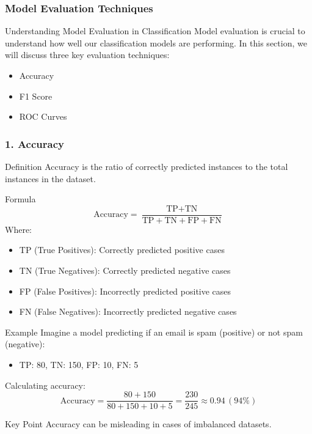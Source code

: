 \documentclass[aspectratio=169]{beamer}
\begin{document}
\begin{frame}[fragile]
    \frametitle{Model Evaluation Techniques}
    \begin{block}{Understanding Model Evaluation in Classification}
        Model evaluation is crucial to understand how well our classification models are performing. In this section, we will discuss three key evaluation techniques:
        \begin{itemize}
            \item Accuracy
            \item F1 Score
            \item ROC Curves
        \end{itemize}
    \end{block}
\end{frame}

\begin{frame}[fragile]
    \frametitle{1. Accuracy}
    \begin{block}{Definition}
        Accuracy is the ratio of correctly predicted instances to the total instances in the dataset.
    \end{block}
    
    \begin{block}{Formula}
        \begin{equation}
            \text{Accuracy} = \frac{\text{TP} + \text{TN}}{\text{TP} + \text{TN} + \text{FP} + \text{FN}}
        \end{equation}
        Where:
        \begin{itemize}
            \item TP (True Positives): Correctly predicted positive cases
            \item TN (True Negatives): Correctly predicted negative cases
            \item FP (False Positives): Incorrectly predicted positive cases
            \item FN (False Negatives): Incorrectly predicted negative cases
        \end{itemize}
    \end{block}
    
    \begin{block}{Example}
        Imagine a model predicting if an email is spam (positive) or not spam (negative):
        \begin{itemize}
            \item TP: 80, TN: 150, FP: 10, FN: 5
        \end{itemize}
        
        Calculating accuracy:
        \begin{equation}
            \text{Accuracy} = \frac{80 + 150}{80 + 150 + 10 + 5} = \frac{230}{245} \approx 0.94 \, (94\%)
        \end{equation}
    \end{block}
    
    \begin{block}{Key Point}
        Accuracy can be misleading in cases of imbalanced datasets.
    \end{block}
\end{frame}
\end{document}
